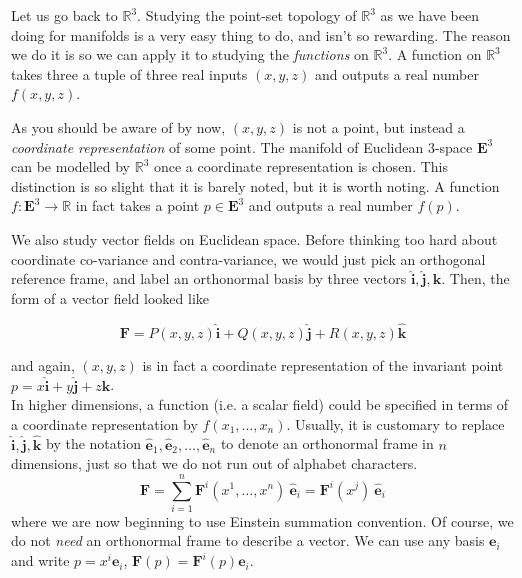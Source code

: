 	
	Let us go back to $\mathbb{R}^3$. Studying the point-set topology of $\mathbb{R}^3$ as we have been doing for manifolds is a very easy thing to do, and isn't so rewarding. The reason we do it is so we can apply it to studying the \emph{functions} on $\mathbb{R}^3$. A function on $\mathbb{R}^3$ takes three a tuple of three real inputs $(x,y,z)$ and outputs a real number $f(x,y,z)$.
	
	As you should be aware of by now, $(x,y,z)$ is not a point, but instead a \emph{coordinate representation} of some point. The manifold of Euclidean 3-space $\mathbf{E}^3$ can be modelled by $\mathbb{R}^3$ once a coordinate representation is chosen. This distinction is so slight that it is barely noted, but it is worth noting. A function $f: \mathbf{E}^3 \rightarrow \mathbb{R}$ in fact takes a point $p \in \mathbf{E}^3$ and outputs a real number $f(p)$.
	
	We also study vector fields on Euclidean space. Before thinking too hard about coordinate co-variance and contra-variance, we would just pick an orthogonal reference frame, and label an orthonormal basis by three vectors $\hat{\mathbf{i}},\hat{\mathbf{j}},\hat{\mathbf{k}}$. Then, the form of a vector field looked like
	
	\begin{equation*}
		\mathbf{F} = P(x,y,z)\hat{\mathbf{i}} + Q(x,y,z)\hat{\mathbf{j}} + R(x,y,z)\hat{\mathbf{k}}
	\end{equation*}
	
	and again, $(x,y,z)$ is in fact a coordinate representation of the invariant point $p = x \hat{\mathbf{i}} + y \hat{\mathbf{j}} + z \hat{\mathbf{k}}$.\\
	
	In higher dimensions, a function (i.e. a scalar field) could be specified in terms of a coordinate representation by $f(x_1, \dots, x_n)$. Usually, it is customary to replace $\hat{\mathbf{i}}, \hat{\mathbf{j}}, \hat{\mathbf{k}}$ by the notation $\hat{\mathbf{e}}_1, \hat{\mathbf{e}}_2, \dots, \hat{\mathbf{e}}_n$ to denote an orthonormal frame in $n$ dimensions, just so that we do not run out of alphabet characters.
	\begin{equation*}
		\mathbf{F} = \sum_{i = 1}^n \mathbf{F}^i(x^1, \dots , x^n) ~ \hat{\mathbf{e}}_i = \mathbf{F}^i(x^j) ~\hat{\mathbf{e}}_i
	\end{equation*}
	where we are now beginning to use Einstein summation convention. Of course, we do not \emph{need} an orthonormal frame to describe a vector. We can use any basis $\mathbf e_i$ and write $p = x^i \mathbf e_i$, $\mathbf{F}(p) = \mathbf{F}^i(p) \mathbf e_i$.
	
